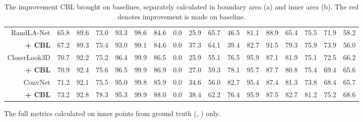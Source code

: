 \documentclass[10pt,twocolumn,letterpaper]{article}
\begin{document}
\begin{table*}
\begin{subtable}{\linewidth}
\begin{center}
{\begin{tabular}{r |c c c | c c c c c c c c c c c c c}
    \hline
    RandLA-Net\cite{randlanet}     & 65.8 & 89.6 & 73.0 & 93.3 & 98.6 & 84.6 & 0.0 & 25.9 & 65.7 & 46.5 & 81.1 & 88.9 & 65.4 & 75.5 & 71.9 & 58.2 \\
    \textbf{+ CBL}                 & {\color{red}67.2} & 89.3 & {\color{red}75.4} & 93.0 & 99.1 & 84.6 & 0.0 & {\color{red}37.3} & 64.1 & 39.4 & {\color{red}82.7} & {\color{red}91.5} & {\color{red}79.3} & {\color{red}75.9} & {\color{red}73.9} & 56.0 \\


    \hline
    CloserLook3D\cite{closerlook}  & 70.7 & 92.2 & 75.2 & 96.4 & 99.9 & 86.5 & 0.0 & 25.9 & 55.1 & 76.5 & 95.9 & 87.1 & 81.9 & 75.1 & 72.5 & 66.2 \\
    \textbf{+ CBL}                 & {\color{red}70.9} & {\color{red}92.4} & {\color{red}75.6} & {\color{red}96.5} & 99.9 & {\color{red}86.9} & 0.0 & {\color{red}27.0} & {\color{red}59.3} & {\color{red}78.1} & 95.7 & {\color{red}87.7} & 80.8 & {\color{red}75.4} & 69.4 & 65.6 \\


    \hline
    ConvNet                        & 71.2 & 92.1 & 75.5 & 95.0 & 99.8 & 85.9 & 0.0 & 34.6 & 56.0 & 82.7 & 95.4 & 87.4 & 81.3 & 73.8 & 68.4 & 65.7 \\
    \textbf{+ CBL}                 & {\color{red}73.2} & {\color{red}92.8} & {\color{red}78.3} & {\color{red}95.3} & {\color{red}99.9} & {\color{red}88.0} & 0.0 & {\color{red}38.4} & {\color{red}62.2} & 76.4 & {\color{red}95.9} & {\color{red}87.5} & {\color{red}82.7} & {\color{red}81.2} & {\color{red}75.2} & {\color{red}68.6} \\


    \hline
    \end{tabular}
    }\end{center}
    \caption{
    The full metrics calculated on inner points from ground truth (\ie, ) only.
    }
    \label{tbl:inner_iou_l}
\end{subtable}

\caption{The improvement CBL brought on baselines, separately calculated in boundary area (a) and inner area (b). The {\color{red} red} denotes improvement is made on baseline.}
\label{tbl:bound_inner_iou}

\end{table*}
\end{document}
